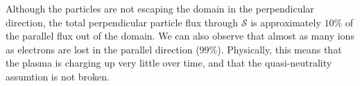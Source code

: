 Although the particles are not escaping the domain in the perpendicular direction, the total perpendicular particle flux through $\mathcal{S}$
is approximately $10\%$ of the parallel flux out of the domain.
We can also observe that almost as many ions as electrons are lost in the parallel direction ($99\%$).
Physically, this means that the plasma is charging up very little over time, and that the quasi-neutrality assumtion is not broken.
